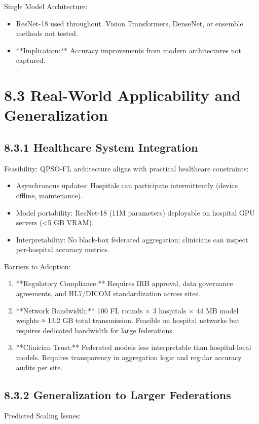Single Model Architecture:

\begin{itemize}
  \item ResNet-18 used throughout. Vision Transformers, DenseNet, or ensemble methods not tested.
  \item **Implication:** Accuracy improvements from modern architectures not captured.
\end{itemize}


\section{8.3 Real-World Applicability and Generalization}

\subsection{8.3.1 Healthcare System Integration}
Feasibility: QPSO-FL architecture aligns with practical healthcare constraints:

\begin{itemize}
  \item Asynchronous updates: Hospitals can participate intermittently (device offline, maintenance).
  \item Model portability: ResNet-18 (11M parameters) deployable on hospital GPU servers (<5 GB VRAM).
  \item Interpretability: No black-box federated aggregation; clinicians can inspect per-hospital accuracy metrics.
\end{itemize}

Barriers to Adoption:

\begin{enumerate}
  \item **Regulatory Compliance:** Requires IRB approval, data governance agreements, and HL7/DICOM standardization across sites.
  \item **Network Bandwidth:** 100 FL rounds × 3 hospitals × 44 MB model weights ≈ 13.2 GB total transmission. Feasible on hospital networks but requires dedicated bandwidth for large federations.
  \item **Clinician Trust:** Federated models less interpretable than hospital-local models. Requires transparency in aggregation logic and regular accuracy audits per site.
\end{enumerate}


\subsection{8.3.2 Generalization to Larger Federations}
Predicted Scaling Issues:

